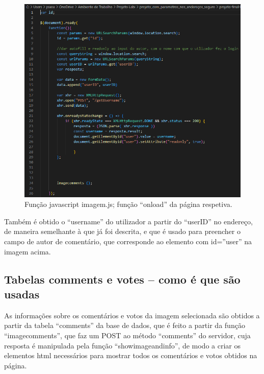 \documentclass{report}
\begin{document}
\begin{figure}[!hbtp]
        \centering
        \includegraphics[scale=0.60]{Images_code/11 - js image.png}
        \caption{\label{Estrutura}Função javascript imagem.js; função “onload” da página respetiva.}
\end{figure}

Também é obtido o “username” do utilizador a partir do “userID” no endereço, de maneira semelhante à que já foi descrita, e que é usado para preencher o campo de autor de comentário, que corresponde ao elemento com id=”user” na imagem acima.

\newpage

 \subsection{Tabelas comments e votes – como é que são usadas}

 As informações sobre os comentários e votos da imagem selecionada são obtidos a partir da tabela “comments” da base de dados, que é feito a partir da função “imagecomments”, que faz um POST ao método “comments” do servidor, cuja resposta é manipulada pela função “showimageandinfo”, de modo a criar os elementos html necessários para mostrar todos os comentários e votos obtidos na página.
\end{document}
